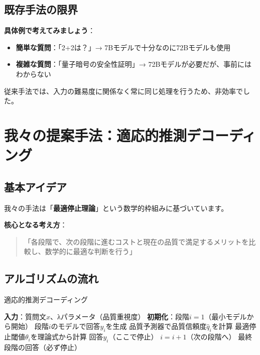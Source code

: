 \documentclass[a4paper,12pt]{jsarticle}
\begin{document}
\subsection{既存手法の限界}

\textbf{具体例で考えてみましょう}：

\begin{itemize}
\item \textbf{簡単な質問}：「2+2は？」→ 7Bモデルで十分なのに72Bモデルも使用
\item \textbf{複雑な質問}：「量子暗号の安全性証明」→ 72Bモデルが必要だが、事前にはわからない
\end{itemize}

従来手法では、入力の難易度に関係なく常に同じ処理を行うため、非効率でした。

\section{我々の提案手法：適応的推測デコーディング}

\subsection{基本アイデア}

我々の手法は「\textbf{最適停止理論}」という数学的枠組みに基づいています。

\textbf{核心となる考え方}：
\begin{quote}
「各段階で、次の段階に進むコストと現在の品質で満足するメリットを比較し、数学的に最適な判断を行う」
\end{quote}

\subsection{アルゴリズムの流れ}

\begin{algorithm}[H]
\caption{適応的推測デコーディング}
\begin{algorithmic}[1]
\STATE \textbf{入力}：質問文$x$、λパラメータ（品質重視度）
\STATE \textbf{初期化}：段階$i = 1$（最小モデルから開始）
    \STATE 段階$i$のモデルで回答$y_i$を生成
    \STATE 品質予測器で品質信頼度$\hat{q}_i$を計算
    \STATE 最適停止閾値$\theta_i$を理論式から計算
        \RETURN 回答$y_i$（ここで停止）
    \ENDIF
    \STATE $i = i + 1$（次の段階へ）
\ENDWHILE
\RETURN 最終段階の回答（必ず停止）
\end{algorithmic}
\end{algorithm}
\end{document}
